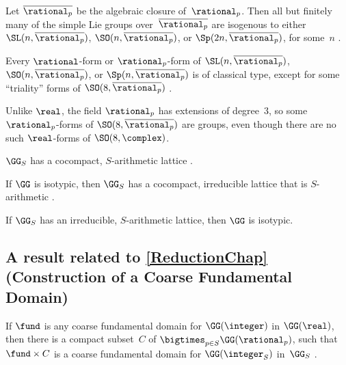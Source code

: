 	\begin{slist}
	
	Let $\overline{\rational_p}$ be the algebraic closure of~$\rational_p$. Then all but finitely many of the simple Lie groups over\/~$\overline{\rational_p}$ are isogenous to either\/ $\SL(n,\overline{\rational_p})$, $\SO(n,\overline{\rational_p})$, or\/ $\Sp(2n,\overline{\rational_p})$, for some~$n$ \cite[Thm.~11.4, pp.~57--58, and Thm.~18.4, p.~101]{Humphreys-LieAlg}.

	 Every $\rational$-form or $\rational_p$-form of $\SL(n,\overline{\rational_p})$, $\SO(n,\overline{\rational_p})$, or $\Sp(n,\overline{\rational_p})$ is of classical type, except for some ``triality'' forms of $\SO(8,\overline{\rational_p})$  \cite[\S2.3]{PlatonovRapinchukBook}.

	 Unlike $\real$, the field $\rational_p$ has extensions of degree~$3$, so some $\rational_p$-forms of $\SO(8,\overline{\rational_p})$ are  groups, even though there are no such $\real$-forms of $\SO(8,\complex)$.
	
	 $\GG_S$ has a cocompact, $S$-arithmetic lattice \cite{BorelHarder-exist}.

	If $\GG$ is isotypic, then $\GG_S$ has a cocompact, irreducible lattice that is $S$-arithmetic \cite{BorelHarder-exist}.

	If $\GG_S$ has an irreducible, $S$-arithmetic lattice, then $\GG$ is isotypic.

	\end{slist}



\subsection*{A result related to \cref{ReductionChap} (Construction of a Coarse Fundamental Domain)}

 If $\fund$ is any coarse fundamental domain for $\GG(\integer)$ in $\GG(\real)$, then there is a compact subset~$C$ of $\bigtimes_{p \in S} \GG(\rational_p)$, such that $\fund \times C$ is a coarse fundamental domain for $\GG(\integer_S)$ in~$\GG_S$
\cite[Prop.~5.11, p.~267]{PlatonovRapinchukBook}.

